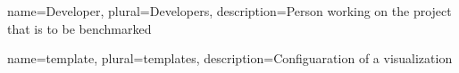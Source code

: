 {
	name=Developer,
	plural=Developers,
	description={Person working on the project that is to be benchmarked}
}

{
	name=template,
	plural=templates,
	description={Configuaration of a visualization}
}

